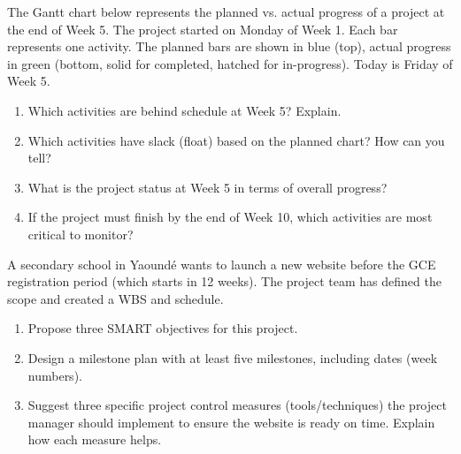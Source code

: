 \documentclass[11pt]{article}
\begin{document}
\begin{exercice}
The Gantt chart below represents the planned vs. actual progress of a project at the end of Week 5. The project started on Monday of Week 1. Each bar represents one activity. The planned bars are shown in blue (top), actual progress in green (bottom, solid for completed, hatched for in-progress). Today is Friday of Week 5.

\begin{center}
\end{center}
\begin{enumerate}
    \item Which activities are behind schedule at Week 5? Explain.
    \item Which activities have slack (float) based on the planned chart? How can you tell?
    \item What is the project status at Week 5 in terms of overall progress?
    \item If the project must finish by the end of Week 10, which activities are most critical to monitor?
\end{enumerate}
\end{exercice}

\begin{exercice}
A secondary school in Yaoundé wants to launch a new website before the GCE registration period (which starts in 12 weeks). The project team has defined the scope and created a WBS and schedule.
\begin{enumerate}
    \item Propose three SMART objectives for this project.
    \item Design a milestone plan with at least five milestones, including dates (week numbers).
    \item Suggest three specific project control measures (tools/techniques) the project manager should implement to ensure the website is ready on time. Explain how each measure helps.
\end{enumerate}
\end{exercice}
\end{document}
